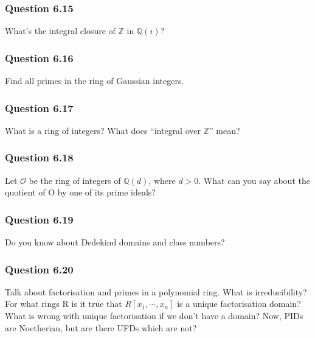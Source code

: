 \hypertarget{question-6.15}{%
\subsubsection{Question 6.15}\label{question-6.15}}

What's the integral closure of \({\mathbb{Z}}\) in \({\mathbb{Q}}(i)\)?

\hypertarget{question-6.16}{%
\subsubsection{Question 6.16}\label{question-6.16}}

Find all primes in the ring of Gaussian integers.

\hypertarget{question-6.17}{%
\subsubsection{Question 6.17}\label{question-6.17}}

What is a ring of integers? What does ``integral over \({\mathbb{Z}}\)''
mean?

\hypertarget{question-6.18}{%
\subsubsection{Question 6.18}\label{question-6.18}}

Let \({\mathcal{O}}\) be the ring of integers of \({\mathbb{Q}}(d)\),
where \(d > 0\). What can you say about the quotient of O by one of its
prime ideals?

\hypertarget{question-6.19}{%
\subsubsection{Question 6.19}\label{question-6.19}}

Do you know about Dedekind domains and class numbers?

\hypertarget{question-6.20}{%
\subsubsection{Question 6.20}\label{question-6.20}}

Talk about factorisation and primes in a polynomial ring. What is
irreducibility? For what rings R is it true that
\(R[x_1, \cdots , x_n]\) is a unique factorisation domain? What is wrong
with unique factorisation if we don't have a domain? Now, PIDs are
Noetherian, but are there UFDs which are not?

